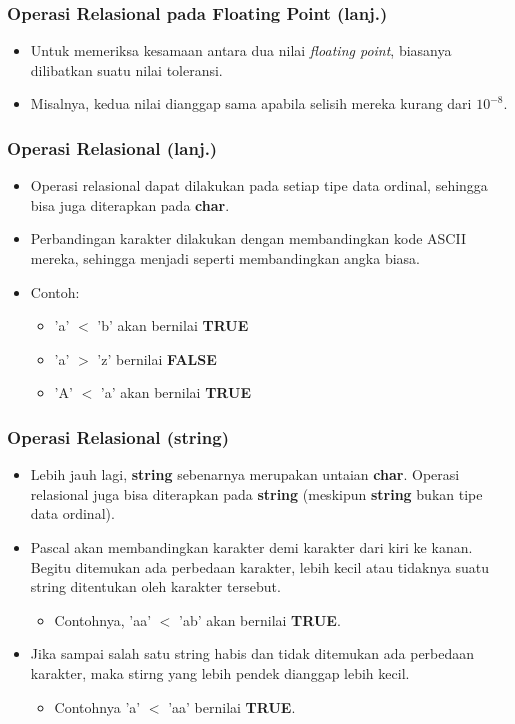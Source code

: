 \begin{frame}
\frametitle{Operasi Relasional pada Floating Point (lanj.)}
\begin{itemize}
  \item Untuk memeriksa kesamaan antara dua nilai \textit{floating point}, biasanya dilibatkan suatu nilai toleransi.
  \item Misalnya, kedua nilai dianggap sama apabila selisih mereka kurang dari $10^{-8}$.
\end{itemize}
\end{frame}

\begin{frame}
\frametitle{Operasi Relasional (lanj.)}
\begin{itemize}
  \item Operasi relasional dapat dilakukan pada setiap tipe data ordinal, sehingga bisa juga diterapkan pada \textbf{char}.
  \item Perbandingan karakter dilakukan dengan membandingkan kode ASCII mereka, sehingga menjadi seperti membandingkan angka biasa.
  \item Contoh:
  \begin{itemize}
    \item 'a' $<$ 'b' akan bernilai \textbf{TRUE}
    \item 'a' $>$ 'z' bernilai \textbf{FALSE}
    \item 'A' $<$ 'a' akan bernilai \textbf{TRUE}
  \end{itemize}
\end{itemize}
\end{frame}

\begin{frame}
\frametitle{Operasi Relasional (string)}
\begin{itemize}
  \item Lebih jauh lagi, \textbf{string} sebenarnya merupakan untaian \textbf{char}. Operasi relasional juga bisa diterapkan pada \textbf{string} (meskipun \textbf{string} bukan tipe data ordinal).
  \item Pascal akan membandingkan karakter demi karakter dari kiri ke kanan. Begitu ditemukan ada perbedaan karakter, lebih kecil atau tidaknya suatu string ditentukan oleh karakter tersebut.
  \begin{itemize}
    \item Contohnya, 'aa' $<$ 'ab' akan bernilai \textbf{TRUE}.
  \end{itemize}
  \item Jika sampai salah satu string habis dan tidak ditemukan ada perbedaan karakter, maka stirng yang lebih pendek dianggap lebih kecil.
  \begin{itemize}
    \item Contohnya 'a' $<$ 'aa' bernilai \textbf{TRUE}.
  \end{itemize}
\end{itemize}
\end{frame}

